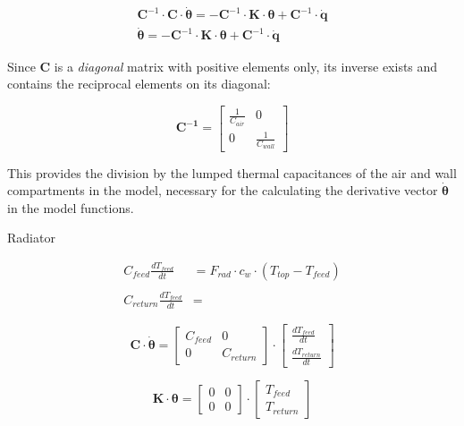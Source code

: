 \begin{subequations}
	\label{eq:matnot_ivp}
	\begin{align}
		\mathbf{C}^{-1} \cdot \mathbf{C} \cdot \boldsymbol{\dot{\theta}} = - \mathbf{C}^{-1} \cdot \mathbf{K} \cdot \boldsymbol{\theta} + \mathbf{C}^{-1} \cdot \mathbf{\dot{q}} \\ 
		\boldsymbol{\dot{\theta}} = - \mathbf{C}^{-1} \cdot \mathbf{K} \cdot \boldsymbol{\theta} + \mathbf{C}^{-1} \cdot \mathbf{\dot{q}}
	\end{align}
\end{subequations}

Since $\mathbf{C}$ is a \emph{diagonal} matrix with positive elements only, its inverse exists and contains the reciprocal elements on its diagonal:

\begin{equation}
	\mathbf{C^{-1}} =
	\begin{bmatrix}
		\frac{1}{C_{air}} & 0 \\
		0 &  \frac{1}{C_{wall}}
	\end{bmatrix}
\end{equation}

This provides the division by the lumped thermal capacitances of the air and wall compartments in the model, necessary for the calculating the derivative vector $\boldsymbol{\dot{\theta}}$ in the model functions. 

Radiator

\begin{equation}
	\begin{aligned}
		C_{feed}\frac{dT_{feed}}{dt} &= F_{rad} \cdot c_w \cdot (T_{top}- T_{feed})
		\\ \\
		C_{return}\frac{dT_{feed}}{dt} &= 
	\end{aligned}
\end{equation} 


\begin{equation}
	\mathbf{C} \cdot \boldsymbol{\dot{\theta}} =
	\begin{bmatrix}
		C_{feed} & 0 \\
		0 &  C_{return}
	\end{bmatrix}
	\cdot
	\begin{bmatrix}
		\frac{dT_{feed}}{dt} \\
		\frac{dT_{return}}{dt}
	\end{bmatrix}
\end{equation}

\begin{equation}
	\mathbf{K} \cdot \boldsymbol{\theta} =
	\begin{bmatrix}
		0 & 0 \\
		0 &  0
	\end{bmatrix}
	\cdot
	\begin{bmatrix}
		T_{feed} \\
		T_{return}
	\end{bmatrix}
\end{equation}

